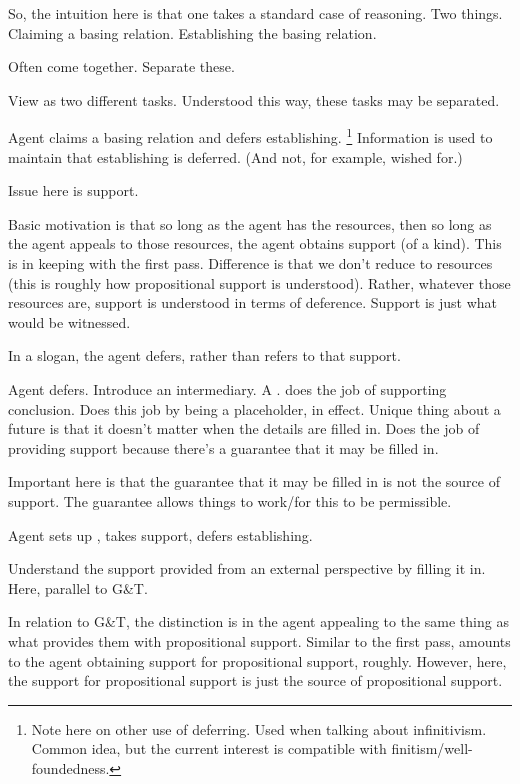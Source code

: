\begin{note}[Deferring]
  So, the intuition here is that one takes a standard case of reasoning.
  Two things.
  Claiming a basing relation.
  Establishing the basing relation.

  Often come together.
  Separate these.

  View as two different tasks.
  Understood this way, these tasks may be separated.

  Agent claims a basing relation and defers establishing.\nolinebreak
  \footnote{
    Note here on other use of deferring.
    Used when talking about infinitivism.
    Common idea, but the current interest is compatible with finitism/well-foundedness.
  }
  Information is used to maintain that establishing is deferred.
  (And not, for example, wished for.)

  Issue here is support.

  Basic motivation is that so long as the agent has the resources, then so long as the agent appeals to those resources, the agent obtains support (of a kind).
  This is in keeping with the first pass.
  Difference is that we don't reduce to resources (this is roughly how propositional support is understood).
  Rather, whatever those resources are, support is understood in terms of deference.
  Support is just what would be witnessed.

  In a slogan, the agent defers, rather than refers to that support.

  Agent defers.
  Introduce an intermediary.
  A \future{}.
  \future{} does the job of supporting conclusion.
  Does this job by being a placeholder, in effect.
  Unique thing about a future is that it doesn't matter when the details are filled in.
  Does the job of providing support because there's a guarantee that it may be filled in.

  Important here is that the guarantee that it may be filled in is not the source of support.
  The guarantee allows things to work/for this to be permissible.

  Agent sets up \future{}, takes support, defers establishing.

  Understand the support provided from an external perspective by filling it in.
  Here, parallel to G\&T.

  In relation to G\&T, the distinction is in the agent appealing to the same thing as what provides them with propositional support.
  Similar to the first pass, amounts to the agent obtaining support for propositional support, roughly.
  However, here, the support for propositional support is just the source of propositional support.


\end{note}
